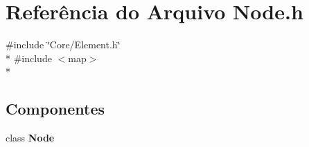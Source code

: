 \section{Referência do Arquivo Node.\+h}
\label{_node_8h}
{\ttfamily \#include \char`\"{}Core/\+Element.\+h\char`\"{}}\\*
{\ttfamily \#include $<$map$>$}\\*
\subsection*{Componentes}
\begin{DoxyCompactItemize}
\item 
class {\bf Node}
\end{DoxyCompactItemize}
